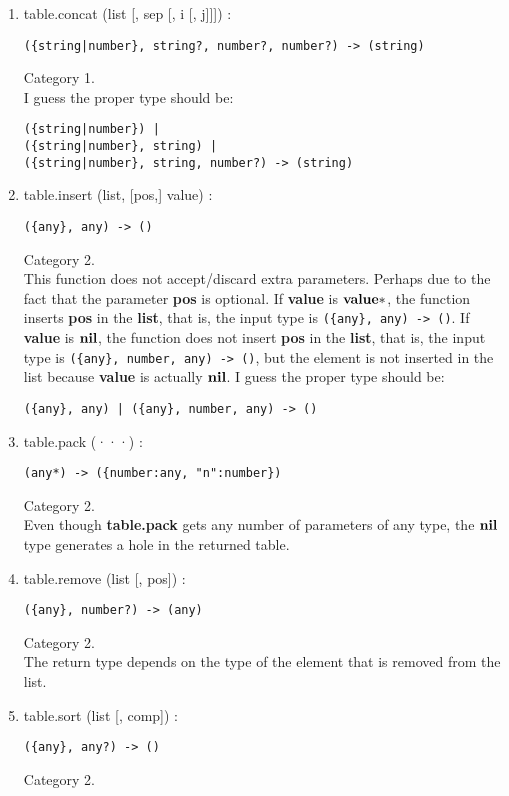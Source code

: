 \begin{enumerate}
\item table.concat (list [, sep [, i [, j]]]) :
\begin{verbatim}
({string|number}, string?, number?, number?) -> (string)
\end{verbatim}
Category 1.
\\
I guess the proper type should be:
\begin{verbatim}
({string|number}) |
({string|number}, string) |
({string|number}, string, number?) -> (string)
\end{verbatim}
\item table.insert (list, [pos,] value) :
\begin{verbatim}
({any}, any) -> ()
\end{verbatim}
Category 2.
\\
This function does not accept/discard extra parameters.
Perhaps due to the fact that the parameter \textbf{pos} is optional.
If \textbf{value} is $\mathbf{value}{*}$, the function inserts \textbf{pos}
in the \textbf{list}, that is, the input type is
\texttt{(\{any\}, any) -> ()}.
If \textbf{value} is $\mathbf{nil}$, the function does not insert \textbf{pos}
in the \textbf{list}, that is, the input type is
\texttt{(\{any\}, number, any) -> ()},
but the element is not inserted in the list because \textbf{value}
is actually $\mathbf{nil}$.
I guess the proper type should be:
\begin{verbatim}
({any}, any) | ({any}, number, any) -> ()
\end{verbatim}
\item table.pack (···) :
\begin{verbatim}
(any*) -> ({number:any, "n":number})
\end{verbatim}
Category 2.
\\
Even though \textbf{table.pack} gets any number of parameters of
any type, the $\mathbf{nil}$ type generates a hole in the returned table.
\item table.remove (list [, pos]) :
\begin{verbatim}
({any}, number?) -> (any)
\end{verbatim}
Category 2.
\\
The return type depends on the type of the element that is removed
from the list.
\item table.sort (list [, comp]) :
\begin{verbatim}
({any}, any?) -> ()
\end{verbatim}
Category 2.
\\

\end{enumerate}
